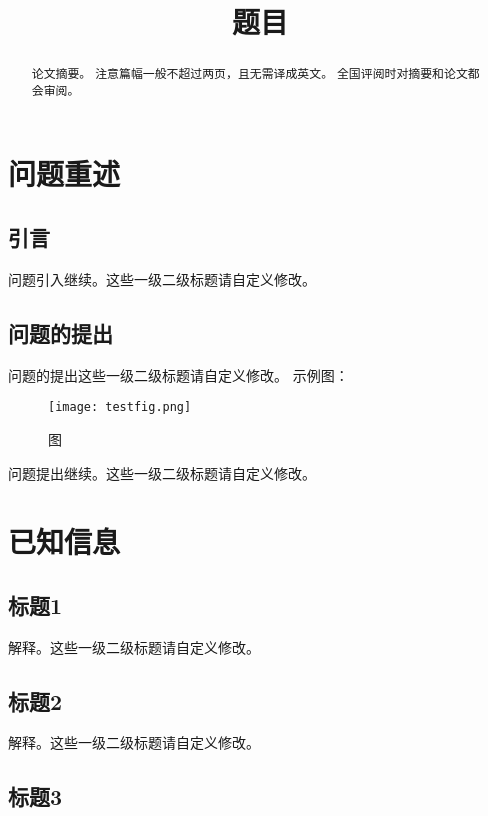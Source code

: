 \documentclass[bwprint]{gmcmthesis}
\title{题目}
\begin{document}
 
 \maketitle
 
\begin{abstract}

论文摘要。
注意篇幅一般不超过两页，且无需译成英文。
全国评阅时对摘要和论文都会审阅。
   

\end{abstract}

\pagestyle{plain}

\tableofcontents
\newpage
\section{问题重述}

\subsection{引言}


问题引入继续。这些一级二级标题请自定义修改。

\subsection{问题的提出}
问题的提出这些一级二级标题请自定义修改。
示例图：
\begin{figure}[!h]
\centering
\texttt{[image: testfig.png]}
\caption{图}
\end{figure}

问题提出继续。这些一级二级标题请自定义修改。

\section{已知信息}
\subsection{标题1}
解释。这些一级二级标题请自定义修改。

\subsection{标题2}
解释。这些一级二级标题请自定义修改。

\subsection{标题3}
\end{document}
